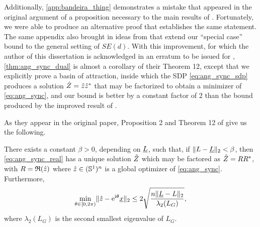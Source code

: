 Additionally, \cref{app:bandeira_thing} demonstrates a mistake that appeared in the original argument of a proposition necessary to the main results of \cite{bandeira2016se_sync}.  Fortunately, we were able to produce an alternative proof that establishes the same statement.  The same appendix also brought in ideas from \cite{bandeira2016tightness} that extend our ``special case'' bound to the general setting of $SE(d)$.  With this improvement, for which the author of this dissertation is acknowledged in an erratum to be issued for \cite{bandeira2016se_sync}, \cref{thm:ang_sync_dual} is almost a corollary of their Theorem 12, except that we explicitly prove a basin of attraction, inside which the SDP \eqref{eq:ang_sync_sdp} produces a solution $\hat{Z} = \hat{z} \hat{z}^*$ that may be factorized to obtain a minimizer of \eqref{eq:ang_sync}, and our bound is better by a constant factor of 2 than the bound produced by the improved result of \cite{bandeira2016se_sync}.

As they appear in the original paper, Proposition 2 and Theorem 12 of \cite{bandeira2016se_sync} give us the following.

\begin{proposition}
  There exists a constant $\beta > 0$, depending on $\underline{L}$, such that, if $\lVert L - \underline{L} \rVert_2 < \beta$, then \eqref{eq:ang_sync_real} has a unique solution $\hat{Z}$ which may be factored as $\hat{Z} = R R^*$, with $R = \mathfrak{R}(\hat{z})$ where $\hat{z} \in (\mathbb{S}^1)^n$ is a global optimizer of \eqref{eq:ang_sync}.  Furthermore, \[\min_{\theta \in [0, 2\pi)} \lVert \hat{z} - \mathrm{e}^{\mathrm{i} \theta} \underline{x} \rVert_2 \le 2 \sqrt{\dfrac{n \lVert \underline{L} - L \rVert_2}{\lambda_2(L_G)}},\] where $\lambda_2(L_G)$ is the second smallest eigenvalue of $L_G$.
\end{proposition}

